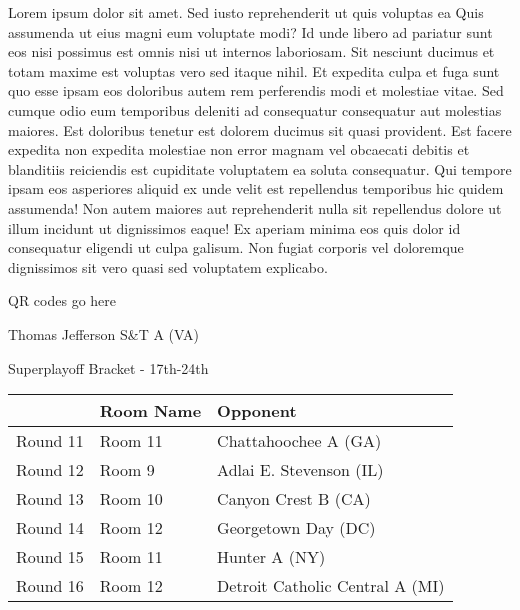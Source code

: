 \documentclass{article}%
\begin{document}
\vspace*{8pt}%
\linebreak%
\newline%
\newline%
    Lorem ipsum dolor sit amet. Sed iusto reprehenderit ut quis voluptas ea Quis assumenda ut eius magni eum voluptate modi? Id unde libero ad pariatur sunt eos nisi possimus est omnis nisi ut internos laboriosam. Sit nesciunt ducimus et totam maxime est voluptas vero sed itaque nihil. Et expedita culpa et fuga sunt quo esse ipsam eos doloribus autem rem perferendis modi et molestiae vitae.\newline%
\newline%
    Sed cumque odio eum temporibus deleniti ad consequatur consequatur aut molestias maiores. Est doloribus tenetur est dolorem ducimus sit quasi provident. Est facere expedita non expedita molestiae non error magnam vel obcaecati debitis et blanditiis reiciendis est cupiditate voluptatem ea soluta consequatur. Qui tempore ipsam eos asperiores aliquid ex unde velit est repellendus temporibus hic quidem assumenda!\newline%
\newline%
    Non autem maiores aut reprehenderit nulla sit repellendus dolore ut illum incidunt ut dignissimos eaque! Ex aperiam minima eos quis dolor id consequatur eligendi ut culpa galisum. Non fugiat corporis vel doloremque dignissimos sit vero quasi sed voluptatem explicabo.\newline%
\newline%
\vspace*{30pt}%
\begin{center}%
\begin{Huge}%
QR codes go here%
\end{Huge}%
\end{center}%
\newpage%
\begin{center}%
\begin{Huge}%
Thomas Jefferson S\&T A (VA)%
\end{Huge}%
\vspace*{8pt}%
\linebreak%
\begin{Large}%
Superplayoff Bracket {-} 17th{-}24th%
\end{Large}%
\end{center}%
%
\begin{tabularx}{\textwidth}{|c|Y|Y|}%
\hline%
&Room Name&Opponent\\%
\hline%
Round 11&Room 11&Chattahoochee A (GA)\\%
Round 12&Room 9&Adlai E. Stevenson (IL)\\%
Round 13&Room 10&Canyon Crest B (CA)\\%
Round 14&Room 12&Georgetown Day (DC)\\%
Round 15&Room 11&Hunter A (NY)\\%
Round 16&Room 12&Detroit Catholic Central A (MI)\\%
\hline%
\end{tabularx}%
\end{document}
